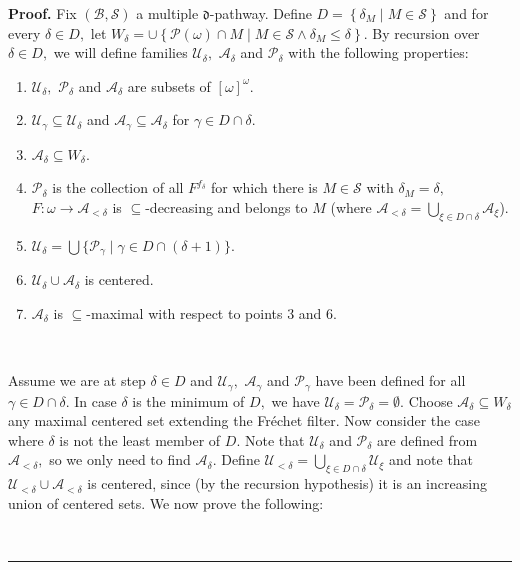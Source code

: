 \documentclass{article}%
\newenvironment{proof}[1][Proof]{\noindent\textbf{#1.} }{\ \rule{0.5em}{0.5em}}
\begin{document}
\begin{proof}
Fix $\left(  \mathcal{B},\mathcal{S}\right)  $ a multiple $\mathfrak{d}%
$-pathway. Define $D=\left\{  \delta_{M}\mid M\in\mathcal{S}\right\}  $ and
for every $\delta\in D,$ let $W_{\delta}=\cup\left\{  \mathcal{P}\left(
\omega\right)  \cap M\mid M\in\mathcal{S}\wedge\delta_{M}\leq\delta\right\}
.$ By recursion over $\delta\in D,$ we will define families $\mathcal{U}%
_{\delta},$ $\mathcal{A}_{\delta}$ and $\mathcal{P}_{\delta}$ with the
following properties:

\begin{enumerate}
\item $\mathcal{U}_{\delta},$ $\mathcal{P}_{\delta}$ and $\mathcal{A}_{\delta
}$ are subsets of $\left[  \omega\right]  ^{\omega}.$

\item $\mathcal{U}_{\gamma}\subseteq\mathcal{U}_{\delta}$ and $\mathcal{A}%
_{\gamma}\subseteq\mathcal{A}_{\delta}$ for $\gamma\in D\cap\delta.$

\item $\mathcal{A}_{\delta}\subseteq W_{\delta}.$

\item $\mathcal{P}_{\delta}$ is the collection of all $F^{f_{\delta}}$ for
which there is $M\in\mathcal{S}$ with $\delta_{M}=\delta,$ $F:\omega
\longrightarrow\mathcal{A}_{<\delta}$ is $\subseteq$-decreasing and belongs to
$M$ (where $\mathcal{A}_{<\delta}=%
{\textstyle\bigcup\limits_{\xi\in D\cap\delta}}
\mathcal{A}_{\xi}$).

\item $\mathcal{U}_{\delta}=%
{\textstyle\bigcup}
\{\mathcal{P}_{\gamma}\mid\gamma\in D\cap\left(  \delta+1\right)  \}.$

\item $\mathcal{U}_{\delta}\cup\mathcal{A}_{\delta}$ is centered.

\item $\mathcal{A}_{\delta}$ is $\subseteq$-maximal with respect to points 3
and 6.
\end{enumerate}

\qquad\qquad\ \ 

Assume we are at step $\delta\in D$ and $\mathcal{U}_{\gamma},$ $\mathcal{A}%
_{\gamma}$ and $\mathcal{P}_{\gamma}$ have been defined for all $\gamma\in
D\cap\delta.$ In case $\delta$ is the minimum of $D,$ we have $\mathcal{U}%
_{\delta}=\mathcal{P}_{\delta}=\emptyset.$ Choose $\mathcal{A}_{\delta
}\subseteq W_{\delta}$ any maximal centered set extending the Fr\'{e}chet
filter. Now consider the case where $\delta$ is not the least member of $D.$
Note that $\mathcal{U}_{\delta}$ and $\mathcal{P}_{\delta}$ are defined from
$\mathcal{A}_{<\delta},$ so we only need to find $\mathcal{A}_{\delta}.$
Define $\mathcal{U}_{<\delta}=%
{\textstyle\bigcup\limits_{\xi\in D\cap\delta}}
\mathcal{U}_{\xi}$ and note that $\mathcal{U}_{<\delta}\cup\mathcal{A}%
_{<\delta}$ is centered, since (by the recursion hypothesis) it is an
increasing union of centered sets. We now prove the following:


\end{proof}
\end{document}
